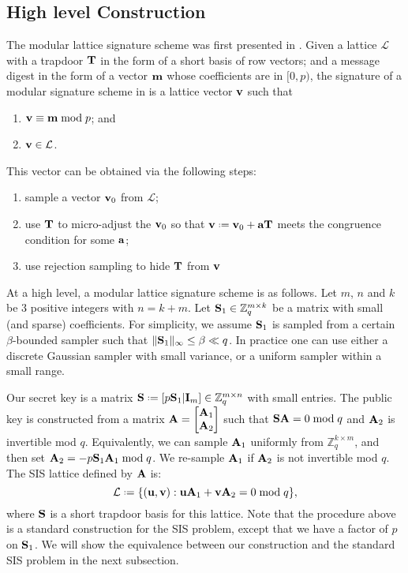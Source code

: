 \documentclass{llncs}
\newcommand{\Lcal}{{\mathcal L}}
\newcommand{\ZZ}{\mathbb{Z}}
\newcommand{\bfa}{{\bf a}}
\newcommand{\bfm}{{\bf m}}
\newcommand{\bfu}{{\bf u}}
\newcommand{\bfv}{{\bf v}}
\newcommand{\bfA}{{\bf A}}
\newcommand{\bfI}{{\bf I}}
\newcommand{\bfS}{{\bf S}}
\newcommand{\bfT}{{\bf T}}
\newcommand{\<}{\langle}
\renewcommand{\>}{\rangle}
\newcommand*{\defeq}{\mathrel{\vcenter{\baselineskip0.5ex \lineskiplimit0pt
                     \hbox{\scriptsize.}\hbox{\scriptsize.}}}%
                     =}
\begin{document}
\subsection{High level Construction}
The modular lattice signature scheme was first presented in \cite{DBLP:conf/pqcrypto/HoffsteinPSSW14}. 
Given a lattice $\Lcal$ with a trapdoor $\bf T$ in the form of a short basis of row vectors; and a message digest in the form of a vector $\bfm$ whose coefficients are in $[0, p)$, 
the signature of a modular signature scheme in \cite{DBLP:conf/pqcrypto/HoffsteinPSSW14} is a lattice vector 
$\bfv$ such that
\begin{enumerate}
\item $\bfv \equiv \bfm \bmod p$; and 
\item $\bfv \in \Lcal$.
\end{enumerate}
This vector can be obtained via the following steps:
\begin{enumerate}
\item sample a vector $\bfv_0$ from $\Lcal$;
\item use $\bfT$ to micro-adjust the $\bfv_0$ so that $\bfv \defeq \bfv_0 + \bfa\bfT$ meets the congruence condition for some $\bfa$;
\item use rejection sampling to hide $\bfT$ from $\bfv$
\end{enumerate}

At a high level, a modular lattice signature scheme is as follows.
Let $m$, $n$ and $k$ be $3$ positive integers with $n = k+m$.
Let $\bfS_1 \in \ZZ_q^{m\times k}$ %
be a matrix with small (and sparse) coefficients.
For simplicity, we assume $\bfS_1$ is sampled from a certain $\beta$-bounded
sampler such that $\|\bfS_1\|_\infty\leq \beta \ll q$.
In practice one can use either a discrete Gaussian sampler with small
variance, or a uniform sampler within a small range.

Our secret key is a matrix $\bfS \defeq [p\bfS_1|\bfI_m]\in \ZZ_q^{m\times n}$ with small entries. 
The public key is constructed from a matrix $\bfA = \begin{bmatrix}
\bfA_1\\\bfA_2
\end{bmatrix}$
such that $\bfS\bfA = 0 \bmod q$ and $\bfA_2$ is invertible mod $  q$. Equivalently, we can sample $\bfA_1$ uniformly from $\ZZ_q^{k\times m}$, and then set
$\bfA_2 = -p\bfS_1\bfA_1 \bmod q$.  We re-sample $\bfA_1$ if $\bfA_2$ is not invertible  mod $  q$.
The SIS lattice defined by $\bfA$ is:
\[\Lcal \defeq \{(\bfu,\bfv): \bfu \bfA_1+\bfv\bfA_2 = 0 \bmod q\},\]
where $\bfS$ is a short trapdoor basis for this lattice. 
Note that the procedure above is a standard construction for the SIS problem, except that we have a factor of $p$ on $\bfS_1$. We will show the equivalence between our construction and the standard SIS problem in the next subsection.
\end{document}
